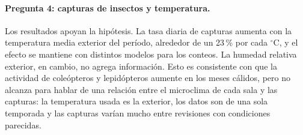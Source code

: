 \documentclass[11pt,a4paper]{article}
\begin{document}
\paragraph{Pregunta 4: capturas de insectos y temperatura.} Los resultados apoyan la hipótesis. La tasa diaria de capturas aumenta con la temperatura media exterior del período, alrededor de un 23\,\% por cada $^\circ$C, y el efecto se mantiene con distintos modelos para los conteos. La humedad relativa exterior, en cambio, no agrega información. Esto es consistente con que la actividad de coleópteros y lepidópteros aumente en los meses cálidos, pero no alcanza para hablar de una relación entre el microclima de cada sala y las capturas: la temperatura usada es la exterior, los datos son de una sola temporada y las capturas varían mucho entre revisiones con condiciones parecidas.
\end{document}
